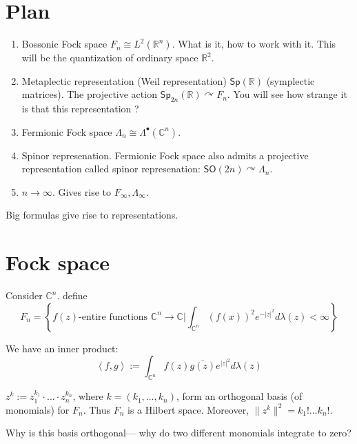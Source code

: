 \section{Plan}
\begin{enumerate}
	\item Bossonic Fock space $F_n\cong L^2(\mathbb{R}^n)$. What is it, how to work with it. This will be the quantization of ordinary space $\mathbb{R}^{2}$.

	\item Metaplectic representation (Weil representation) $\mathsf{Sp}(\mathbb{R})$ (symplectic matrices). The projective action $\mathsf{Sp}_{2n}(\mathbb{R})\curvearrowright F_n$. You will see how strange it is that this representation {\color{4}?}

	\item Fermionic Fock space $\Lambda_n\cong \Lambda^\bullet(\mathbb{C}^n)$.

	\item Spinor represenation. Fermionic Fock space also admits a projective representation called spinor represenation: $\mathsf{SO}(2n) \curvearrowright \Lambda_n$.
	
	\item $n\to \infty$. Gives rise to $F_\infty, \Lambda_\infty$.
\end{enumerate}

Big formulas give rise to representations.


\section{Fock space}

Consider $\mathbb{C}^{n}$. define
\[F_n=\left\{\text{$f(z)$-entire functions  $\mathbb{C}^{n}\to \mathbb{C}$}\Big| \int_{\mathbb{C}^{n}}(f(x))^2e^{-|z|^2}d\lambda(z)<\infty\right\}\]

We have an inner product:
\[\left<f,g\right> :=\int_{\mathbb{C}^{n}}f(z)\overline{g(z)}e^{|z|^2}d \lambda(z)\]

\begin{prop}\leavevmode
	$z^k:=z_1^{k_1}\cdot\ldots\cdot z_n^{k_n}$, where $k=(k_1,\ldots,k_n)$, form an orthogonal basis (of monomials) for $F_n$. Thus $F_n$ is a Hilbert space. Moreover, $\|z^k\|^2=k_1!\ldots k_n!$.
\end{prop}

\begin{question}\leavevmode
	Why is this basis orthogonal--- why do two different monomials integrate to zero?
\end{question}

